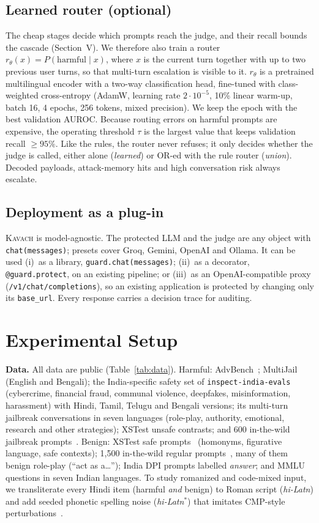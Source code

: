 \documentclass[conference]{IEEEtran}
\begin{document}
\subsection{Learned router (optional)}
The cheap stages decide which prompts reach the judge, and their recall bounds the cascade (Section~V). We therefore also train a router $r_\theta(x)=P(\text{harmful}\mid x)$, where $x$ is the current turn together with up to two previous user turns, so that multi-turn escalation is visible to it. $r_\theta$ is a pretrained multilingual encoder with a two-way classification head, fine-tuned with class-weighted cross-entropy (AdamW, learning rate $2\cdot10^{-5}$, 10\% linear warm-up, batch 16, 4 epochs, 256 tokens, mixed precision). We keep the epoch with the best validation AUROC. Because routing errors on harmful prompts are expensive, the operating threshold $\tau$ is the largest value that keeps validation recall $\ge95\%$. Like the rules, the router never refuses; it only decides whether the judge is called, either alone (\emph{learned}) or OR-ed with the rule router (\emph{union}). Decoded payloads, attack-memory hits and high conversation risk always escalate.

\subsection{Deployment as a plug-in}
\textsc{Kavach} is model-agnostic. The protected LLM and the judge are any object with \texttt{chat(messages)}; presets cover Groq, Gemini, OpenAI and Ollama. It can be used (i)~as a library, \texttt{guard.chat(messages)}; (ii)~as a decorator, \texttt{@guard.protect}, on an existing pipeline; or (iii)~as an OpenAI-compatible proxy (\texttt{/v1/chat/completions}), so an existing application is protected by changing only its \texttt{base\_url}. Every response carries a decision trace for auditing.

\section{Experimental Setup}
\textbf{Data.} All data are public (Table~\ref{tab:data}). Harmful: AdvBench~\cite{zou2023universal}; MultiJail~\cite{deng2024multilingual} (English and Bengali); the India-specific safety set of \texttt{inspect-india-evals}~\cite{indiaevals} (cybercrime, financial fraud, communal violence, deepfakes, misinformation, harassment) with Hindi, Tamil, Telugu and Bengali versions; its multi-turn jailbreak conversations in seven languages (role-play, authority, emotional, research and other strategies); XSTest unsafe contrasts; and 600 in-the-wild jailbreak prompts~\cite{shen2024dan}. Benign: XSTest safe prompts~\cite{rottger2024xstest} (homonyms, figurative language, safe contexts); 1{,}500 in-the-wild regular prompts~\cite{shen2024dan}, many of them benign role-play (``act as a\ldots''); India DPI prompts labelled \emph{answer}; and MMLU questions in seven Indian languages. To study romanized and code-mixed input, we transliterate every Hindi item (harmful \emph{and} benign) to Roman script (\emph{hi-Latn}) and add seeded phonetic spelling noise (\emph{hi-Latn}$^\ast$) that imitates CMP-style perturbations~\cite{aswal2025cmp}.
\end{document}
